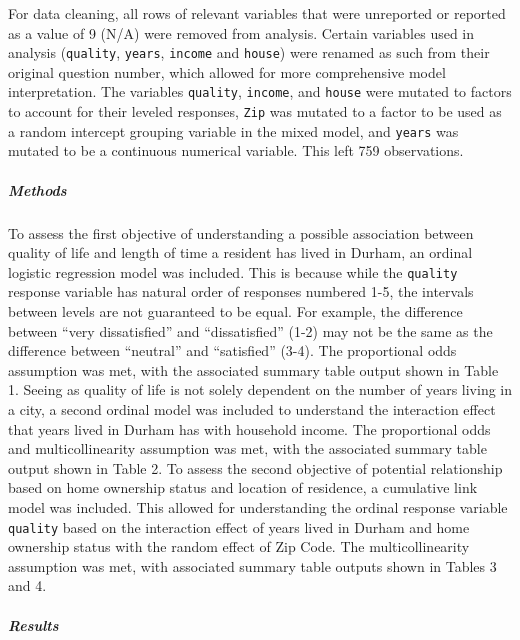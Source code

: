 \documentclass[
  4pt,
]{article}
\begin{document}
For data cleaning, all rows of relevant variables that were unreported
or reported as a value of 9 (N/A) were removed from analysis. Certain
variables used in analysis (\texttt{quality}, \texttt{years},
\texttt{income} and \texttt{house}) were renamed as such from their
original question number, which allowed for more comprehensive model
interpretation. The variables \texttt{quality}, \texttt{income}, and
\texttt{house} were mutated to factors to account for their leveled
responses, \texttt{Zip} was mutated to a factor to be used as a random
intercept grouping variable in the mixed model, and \texttt{years} was
mutated to be a continuous numerical variable. This left 759
observations.

\subparagraph{Methods}\label{methods}

To assess the first objective of understanding a possible association
between quality of life and length of time a resident has lived in
Durham, an ordinal logistic regression model was included. This is
because while the \texttt{quality} response variable has natural order
of responses numbered 1-5, the intervals between levels are not
guaranteed to be equal. For example, the difference between ``very
dissatisfied'' and ``dissatisfied'' (1-2) may not be the same as the
difference between ``neutral'' and ``satisfied'' (3-4). The proportional
odds assumption was met, with the associated summary table output shown
in Table 1. Seeing as quality of life is not solely dependent on the
number of years living in a city, a second ordinal model was included to
understand the interaction effect that years lived in Durham has with
household income. The proportional odds and multicollinearity assumption
was met, with the associated summary table output shown in Table 2. To
assess the second objective of potential relationship based on home
ownership status and location of residence, a cumulative link model was
included. This allowed for understanding the ordinal response variable
\texttt{quality} based on the interaction effect of years lived in
Durham and home ownership status with the random effect of Zip Code. The
multicollinearity assumption was met, with associated summary table
outputs shown in Tables 3 and 4.

\subparagraph{Results}\label{results}
\end{document}
